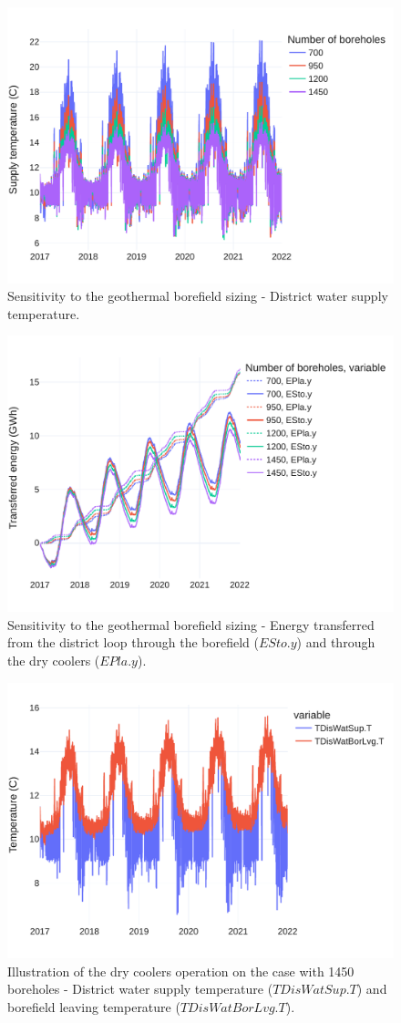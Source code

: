 \begin{figure}[!htbp]
\centering
\includegraphics[width=.7\linewidth]{../python_scripts/figures/GeoSizing.pdf}
\caption{Sensitivity to the geothermal borefield sizing - District water supply temperature.}
\label{fig:geo_sizing_tsup}
\end{figure}

\begin{figure}[!htbp]
\centering
\includegraphics[width=.7\linewidth]{../python_scripts/figures/GeoSizingE.pdf}
\caption{Sensitivity to the geothermal borefield sizing - Energy transferred from the district loop through the borefield ($ESto.y$) and through the dry coolers ($EPla.y$).}
\label{fig:geo_sizing_energy}
\end{figure}


\begin{figure}[!htbp]
\centering
\includegraphics[width=.7\linewidth]{../python_scripts/figures/GeoBestCaseT.pdf}
\caption{Illustration of the dry coolers operation on the case with 1450 boreholes - District water supply temperature ($TDisWatSup.T$) and borefield leaving temperature ($TDisWatBorLvg.T$).}
\label{fig:coolers_tsup}
\end{figure}



